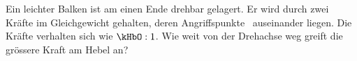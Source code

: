 Ein leichter Balken ist am einen Ende drehbar gelagert. Er wird durch zwei Kräfte im Gleichgewicht gehalten, deren Angriffspunkte \dHbO\ auseinander liegen. Die Kräfte verhalten sich wie $\kHbO : 1$. Wie weit von der Drehachse weg greift die grössere Kraft am Hebel an?
